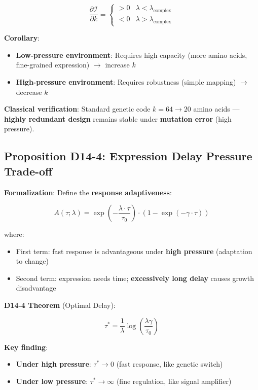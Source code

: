 \documentclass[12pt,a4paper]{article}
\newcommand{\calI}{\mathcal{I}}
\newcommand{\lcomplx}{\lambda_{\text{complex}}}
\newcommand{\tauom}{\tau_0}
\newcommand{\gammat}{\gamma}
\newcommand{\taus}{\tau^*}
\begin{document}
$$\frac{\partial \calI}{\partial k} = \begin{cases} > 0 & \lambda < \lcomplx \\ < 0 & \lambda > \lcomplx \end{cases}$$

\textbf{Corollary}:
\begin{itemize}
    \item \textbf{Low-pressure environment}: Requires high capacity (more amino acids, fine-grained expression) $\rightarrow$ increase $k$
    \item \textbf{High-pressure environment}: Requires robustness (simple mapping) $\rightarrow$ decrease $k$
\end{itemize}

\textbf{Classical verification}: Standard genetic code $k=64 \to 20$ amino acids --- \textbf{highly redundant design} remains stable under \textbf{mutation error} (high pressure).

\subsection{Proposition D14-4: Expression Delay Pressure Trade-off}

\textbf{Formalization}: Define the \textbf{response adaptiveness}:

$$A(\tau; \lambda) = \exp\left(-\frac{\lambda \cdot \tau}{\tauom}\right) \cdot (1 - \exp(-\gammat \cdot \tau))$$

where:
\begin{itemize}
    \item First term: fast response is advantageous under \textbf{high pressure} (adaptation to change)
    \item Second term: expression needs time; \textbf{excessively long delay} causes growth disadvantage
\end{itemize}

\textbf{D14-4 Theorem} (Optimal Delay):

$$\taus = \frac{1}{\lambda} \log\left(\frac{\lambda \gammat}{\tauom}\right)$$

\textbf{Key finding}:
\begin{itemize}
    \item \textbf{Under high pressure}: $\taus \to 0$ (fast response, like genetic switch)
    \item \textbf{Under low pressure}: $\taus \to \infty$ (fine regulation, like signal amplifier)
\end{itemize}
\end{document}
